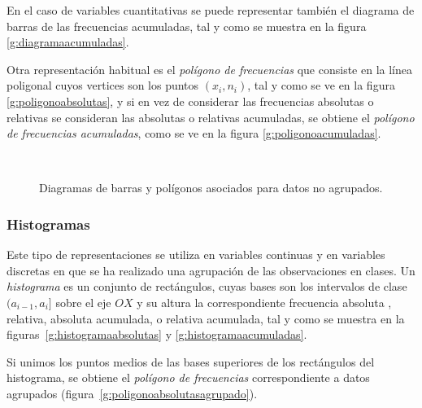 En el caso de variables cuantitativas se puede representar también el diagrama de barras de las frecuencias acumuladas,
tal y como se muestra en la figura \ref{g:diagramaacumuladas}.

Otra representación habitual es el \emph{polígono de frecuencias} que consiste en la línea poligonal cuyos vertices son
los puntos $(x_i,n_i)$, tal y como se ve en la figura \ref{g:poligonoabsolutas}, y si en vez de considerar las
frecuencias absolutas o relativas se consideran las absolutas o relativas acumuladas, se obtiene el \emph{polígono de
frecuencias acumuladas}, como se ve en la figura \ref{g:poligonoacumuladas}.

\begin{figure}[h!]
\centering
{}\qquad
{}\\
\qquad
{}
\caption{Diagramas de barras y polígonos asociados para datos no
agrupados.}
\end{figure}


\subsubsection{Histogramas}
Este tipo de representaciones se utiliza en variables continuas y en variables discretas en que se ha realizado una
agrupación de las observaciones en clases. Un \emph{histograma} es un conjunto de rectángulos, cuyas bases son los
intervalos de clase $(a_{i-1},a_i]$ sobre el eje $OX$ y su altura la correspondiente frecuencia absoluta , relativa,
absoluta acumulada, o relativa acumulada, tal y como se muestra en la figuras~\ref{g:histogramaabsolutas} y
\ref{g:histogramaacumuladas}.

Si unimos los puntos medios de las bases superiores de los rectángulos del histograma, se obtiene el \emph{polígono de
frecuencias} correspondiente a datos agrupados (figura~\ref{g:poligonoabsolutasagrupado}).

